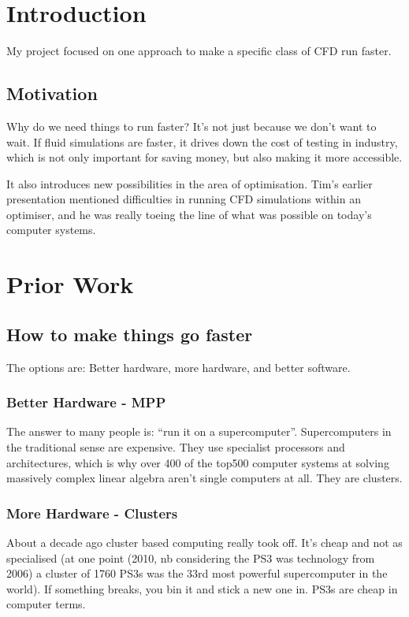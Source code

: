 \documentclass[10pt]{article}
\begin{document}
\sloppy

\tableofcontents

\section{Introduction}
    My project focused on one approach to make a specific class of CFD run faster.

    \subsection{Motivation}
        Why do we need things to run faster? It's not just because we don't want to wait. If fluid simulations are faster, it drives down the cost of testing in industry, which is not only important for saving money, but also making it more accessible.
        
        It also introduces new possibilities in the area of optimisation. Tim's earlier presentation mentioned difficulties in running CFD simulations within an optimiser, and he was really toeing the line of what was possible on today's computer systems. 

\section{Prior Work}
    \subsection{How to make things go faster}
        The options are: Better hardware, more hardware, and better software.

        \subsubsection{Better Hardware - MPP}
        	The answer to many people is: ``run it on a supercomputer''. Supercomputers in the traditional sense are expensive. They use specialist processors and architectures, which is why over 400 of the top500 computer systems at solving massively complex linear algebra aren't single computers at all. They are clusters. 

        \subsubsection{More Hardware - Clusters}
            About a decade ago cluster based computing really took off. It's cheap and not as specialised (at one point (2010, nb considering the PS3 was technology from 2006) a cluster of 1760 PS3s was the 33rd most powerful supercomputer in the world). If something breaks, you bin it and stick a new one in. PS3s are cheap in computer terms. 
\end{document}
